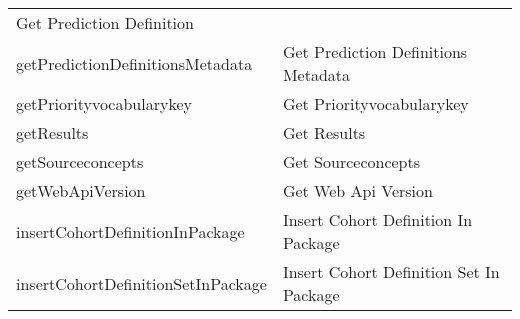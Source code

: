 \documentclass[
]{article}
\begin{document}
\begin{longtable}[]{@{}ll@{}}
\begin{minipage}[t]{0.48\columnwidth}
Get Prediction Definition\strut
\end{minipage}\tabularnewline
\begin{minipage}[t]{0.46\columnwidth}\raggedright
getPredictionDefinitionsMetadata\strut
\end{minipage} & \begin{minipage}[t]{0.48\columnwidth}\raggedright
Get Prediction Definitions Metadata\strut
\end{minipage}\tabularnewline
\begin{minipage}[t]{0.46\columnwidth}\raggedright
getPriorityvocabularykey\strut
\end{minipage} & \begin{minipage}[t]{0.48\columnwidth}\raggedright
Get Priorityvocabularykey\strut
\end{minipage}\tabularnewline
\begin{minipage}[t]{0.46\columnwidth}\raggedright
getResults\strut
\end{minipage} & \begin{minipage}[t]{0.48\columnwidth}\raggedright
Get Results\strut
\end{minipage}\tabularnewline
\begin{minipage}[t]{0.46\columnwidth}\raggedright
getSourceconcepts\strut
\end{minipage} & \begin{minipage}[t]{0.48\columnwidth}\raggedright
Get Sourceconcepts\strut
\end{minipage}\tabularnewline
\begin{minipage}[t]{0.46\columnwidth}\raggedright
getWebApiVersion\strut
\end{minipage} & \begin{minipage}[t]{0.48\columnwidth}\raggedright
Get Web Api Version\strut
\end{minipage}\tabularnewline
\begin{minipage}[t]{0.46\columnwidth}\raggedright
insertCohortDefinitionInPackage\strut
\end{minipage} & \begin{minipage}[t]{0.48\columnwidth}\raggedright
Insert Cohort Definition In Package\strut
\end{minipage}\tabularnewline
\begin{minipage}[t]{0.46\columnwidth}\raggedright
insertCohortDefinitionSetInPackage\strut
\end{minipage} & \begin{minipage}[t]{0.48\columnwidth}\raggedright
Insert Cohort Definition Set In Package\strut

\end{minipage}
\end{longtable}
\end{document}
